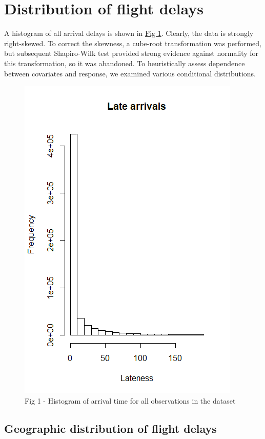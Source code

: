 \documentclass[12pt, a4paper]{book}
\newcommand\tab[1][1cm]{\hspace*{#1}}
\begin{document}
	\section{Distribution of flight delays}
	
	\tab A histogram of all arrival delays is shown in \underline{Fig 1}. Clearly, the data is strongly right-skewed. To correct the skewness, a cube-root transformation was performed, but subsequent Shapiro-Wilk test provided strong evidence against normality for this transformation, so it was abandoned. To heuristically assess dependence between covariates and response, we examined various conditional distributions.\\
	\begin{figure}
	\centering
	 \includegraphics[width = .45 \textwidth]{../figures/LateArrivalsHistogram}
	 \caption{Fig 1 - Histogram of arrival time for all observations in the dataset}
	 \end{figure}
	 
		\subsection{Geographic distribution of flight delays}
		
\end{document}
